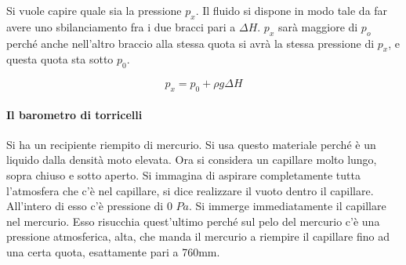 \FloatBarrier
Si vuole capire quale sia la pressione $p_x$. Il fluido si dispone in modo tale da far avere uno sbilanciamento fra i due bracci pari a $\Delta H$. $p_x$ sarà maggiore di $p_o$ perché anche nell'altro braccio alla stessa quota si avrà la stessa pressione di $p_x$, e questa quota sta sotto $p_0$.

\[
	p_x = p_0 + \rho g\Delta H
\]

\paragraph{Il barometro di torricelli} Si ha un recipiente riempito di mercurio. Si usa questo materiale perché è un liquido dalla densità moto elevata. Ora si considera un capillare molto lungo, sopra chiuso e sotto aperto. Si immagina di aspirare completamente tutta l'atmosfera che c'è nel capillare, si dice realizzare il vuoto dentro il capillare. All'intero di esso c'è pressione di 0 $Pa$. Si immerge immediatamente il capillare nel mercurio. Esso risucchia quest'ultimo perché sul pelo del mercurio c'è una pressione atmosferica, alta, che manda il mercurio a riempire il capillare fino ad una certa quota, esattamente pari a 760mm.

